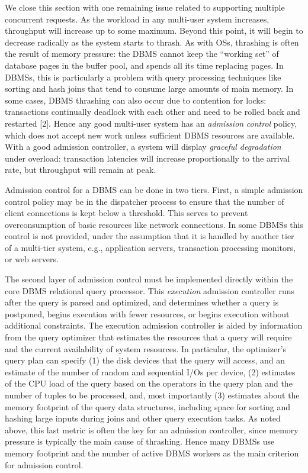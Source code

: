 \documentclass[b5paper,11pt,twoside,openright]{book}
\begin{document}
We close this section with one remaining issue related to supporting
multiple concurrent requests. As the workload in any multi-user system
increases, throughput will increase up to some maximum. Beyond this
point, it will begin to decrease radically as the system starts to
thrash. As with OSs, thrashing is often the result of memory pressure:
the DBMS cannot keep the ``working set'' of database pages in the buffer
pool, and spends all its time replacing pages. In DBMSs, this is
particularly a problem with query processing techniques like sorting and
hash joins that tend to consume large amounts of main memory. In some
cases, DBMS thrashing can also occur due to contention for locks:
transactions continually deadlock with each other and need to be rolled
back and restarted {[}2{]}. Hence any good multi-user system has an
\emph{admission} \emph{control} policy, which does not accept new work
unless sufficient DBMS resources are available. With a good admission
controller, a system will display \emph{graceful degradation} under
overload: transaction latencies will increase proportionally to the
arrival rate, but throughput will remain at peak.

Admission control for a DBMS can be done in two tiers. First, a simple
admission control policy may be in the dispatcher process to ensure that
the number of client connections is kept below a threshold. This serves
to prevent overconsumption of basic resources like network connections.
In some DBMSs this control is not provided, under the assumption that it
is handled by another tier of a multi-tier system, e.g., application
servers, transaction processing monitors, or web servers.

The second layer of admission control must be implemented directly
within the core DBMS relational query processor. This \emph{execution}
admission controller runs after the query is parsed and optimized, and
determines whether a query is postponed, begins execution with fewer
resources, or begins execution without additional constraints. The
execution admission controller is aided by information from the query
optimizer that estimates the resources that a query will require and the
current availability of system resources. In particular, the optimizer's
query plan can specify (1) the disk devices that the query will access,
and an estimate of the number of random and sequential I/Os per device,
(2) estimates of the CPU load of the query based on the operators in the
query plan and the number of tuples to be processed, and, most
importantly (3) estimates about the memory footprint of the query data
structures, including space for sorting and hashing large inputs during
joins and other query execution tasks. As noted above, this last metric
is often the key for an admission controller, since memory pressure is
typically the main cause of thrashing. Hence many DBMSs use memory
footprint and the number of active DBMS workers as the main criterion
for admission control.
\end{document}
